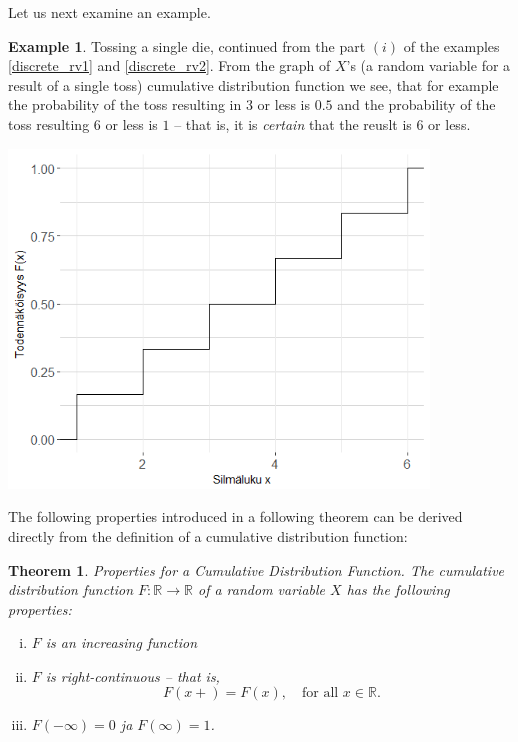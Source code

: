 \documentclass[12pt,a4paper,leqno]{report}
\newcommand{\R}{\mathbb{R}}
\theoremstyle{plain}
\newtheorem{lause}[equation]{Theorem}
\theoremstyle{definition}
\newtheorem{esim}[equation]{Example}
\begin{document}
Let us next examine an example.

\begin{esim} \label{esim:discrete_rv_cdf}
Tossing a single die, continued from the part $(i)$ of the examples \ref{discrete_rv1} and \ref{discrete_rv2}. From the graph of $X$'s (a random variable for a result of a single toss) cumulative distribution function we see, that for example the probability of the toss resulting in 3 or less is $0.5$ and the probability of the toss resulting 6 or less is $1$ -- that is, it is \emph{certain} that the reuslt is 6 or less.

\begin{center}
\includegraphics[height = 9cm]{noppa_cdf.png}
\label{kuva:nopanheiton_kf}
\end{center}

\end{esim}

The following properties introduced in a following theorem can be derived directly from the definition of a cumulative distribution function:

\begin{lause}\label{lause:cdf_properties} 
Properties for a Cumulative Distribution Function. The cumulative distribution function $F:\R \rightarrow \R$ of a random variable $X$ has the following properties:
\begin{enumerate}[(i)]
\item $F$ is an increasing function
\item $F$ is right-continuous -- that is,
\[
F(x+) = F(x), \quad \text{for all } x \in \R.
\]
\item $F(-\infty) = 0$ ja $F(\infty) = 1$. 
\end{enumerate}
\end{lause}
\end{document}
